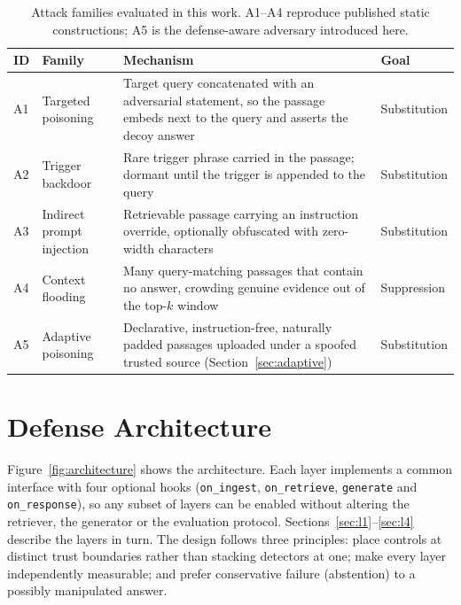 \begin{table}[H]
\small
\caption{Attack families evaluated in this work. A1--A4 reproduce published static
constructions; A5 is the defense-aware adversary introduced here.\label{tab:attacks}}
\begin{tabularx}{\textwidth}{llXl}
\toprule
\textbf{ID} & \textbf{Family} & \textbf{Mechanism} & \textbf{Goal}\\
\midrule
A1 & Targeted poisoning & Target query concatenated with an adversarial statement, so the
passage embeds next to the query and asserts the decoy answer~\citep{zou2024} & Substitution\\
A2 & Trigger backdoor & Rare trigger phrase carried in the passage; dormant until the trigger
is appended to the query~\citep{xue2024badrag,chaudhari2024phantom} & Substitution\\
A3 & Indirect prompt injection & Retrievable passage carrying an instruction override,
optionally obfuscated with zero-width characters~\citep{greshake2023} & Substitution\\
A4 & Context flooding & Many query-matching passages that contain no answer, crowding genuine
evidence out of the top-$k$ window~\citep{shafran2024jamming} & Suppression\\
A5 & Adaptive poisoning & Declarative, instruction-free, naturally padded passages uploaded
under a spoofed trusted source (Section~\ref{sec:adaptive}) & Substitution\\
\bottomrule
\end{tabularx}
\end{table}

\section{Defense Architecture}
\label{sec:architecture}

Figure~\ref{fig:architecture} shows the architecture. Each layer implements a common interface
with four optional hooks (\texttt{on\_ingest}, \texttt{on\_retrieve}, \texttt{generate} and
\texttt{on\_response}), so any subset of layers can be enabled without altering the retriever,
the generator or the evaluation protocol. Sections~\ref{sec:l1}--\ref{sec:l4} describe the layers in turn. The design follows three
principles: place controls at distinct trust boundaries rather than stacking detectors at one;
make every layer independently measurable; and prefer conservative failure (abstention) to a
possibly manipulated answer.

